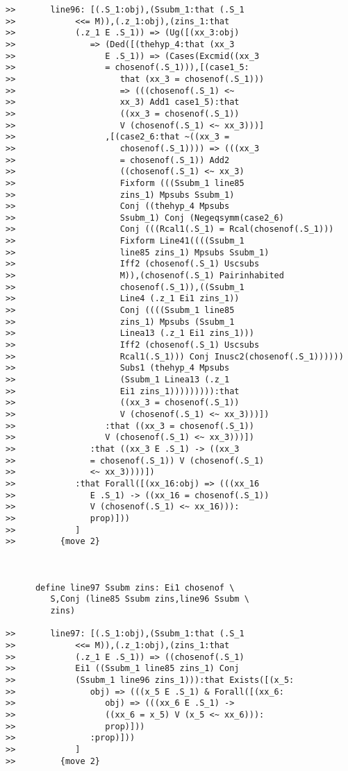 \documentclass[12pt]{article}
\begin{document}
\begin{verbatim}
>>       line96: [(.S_1:obj),(Ssubm_1:that (.S_1
>>            <<= M)),(.z_1:obj),(zins_1:that
>>            (.z_1 E .S_1)) => (Ug([(xx_3:obj)
>>               => (Ded([(thehyp_4:that (xx_3
>>                  E .S_1)) => (Cases(Excmid((xx_3
>>                  = chosenof(.S_1))),[(case1_5:
>>                     that (xx_3 = chosenof(.S_1)))
>>                     => (((chosenof(.S_1) <~
>>                     xx_3) Add1 case1_5):that
>>                     ((xx_3 = chosenof(.S_1))
>>                     V (chosenof(.S_1) <~ xx_3)))]
>>                  ,[(case2_6:that ~((xx_3 =
>>                     chosenof(.S_1)))) => (((xx_3
>>                     = chosenof(.S_1)) Add2
>>                     ((chosenof(.S_1) <~ xx_3)
>>                     Fixform (((Ssubm_1 line85
>>                     zins_1) Mpsubs Ssubm_1)
>>                     Conj ((thehyp_4 Mpsubs
>>                     Ssubm_1) Conj (Negeqsymm(case2_6)
>>                     Conj (((Rcal1(.S_1) = Rcal(chosenof(.S_1)))
>>                     Fixform Line41((((Ssubm_1
>>                     line85 zins_1) Mpsubs Ssubm_1)
>>                     Iff2 (chosenof(.S_1) Uscsubs
>>                     M)),(chosenof(.S_1) Pairinhabited
>>                     chosenof(.S_1)),((Ssubm_1
>>                     Line4 (.z_1 Ei1 zins_1))
>>                     Conj ((((Ssubm_1 line85
>>                     zins_1) Mpsubs (Ssubm_1
>>                     Linea13 (.z_1 Ei1 zins_1)))
>>                     Iff2 (chosenof(.S_1) Uscsubs
>>                     Rcal1(.S_1))) Conj Inusc2(chosenof(.S_1))))))
>>                     Subs1 (thehyp_4 Mpsubs
>>                     (Ssubm_1 Linea13 (.z_1
>>                     Ei1 zins_1))))))))):that
>>                     ((xx_3 = chosenof(.S_1))
>>                     V (chosenof(.S_1) <~ xx_3)))])
>>                  :that ((xx_3 = chosenof(.S_1))
>>                  V (chosenof(.S_1) <~ xx_3)))])
>>               :that ((xx_3 E .S_1) -> ((xx_3
>>               = chosenof(.S_1)) V (chosenof(.S_1)
>>               <~ xx_3))))])
>>            :that Forall([(xx_16:obj) => (((xx_16
>>               E .S_1) -> ((xx_16 = chosenof(.S_1))
>>               V (chosenof(.S_1) <~ xx_16))):
>>               prop)]))
>>            ]
>>         {move 2}



      define line97 Ssubm zins: Ei1 chosenof \
         S,Conj (line85 Ssubm zins,line96 Ssubm \
         zins)

>>       line97: [(.S_1:obj),(Ssubm_1:that (.S_1
>>            <<= M)),(.z_1:obj),(zins_1:that
>>            (.z_1 E .S_1)) => ((chosenof(.S_1)
>>            Ei1 ((Ssubm_1 line85 zins_1) Conj
>>            (Ssubm_1 line96 zins_1))):that Exists([(x_5:
>>               obj) => (((x_5 E .S_1) & Forall([(xx_6:
>>                  obj) => (((xx_6 E .S_1) ->
>>                  ((xx_6 = x_5) V (x_5 <~ xx_6))):
>>                  prop)]))
>>               :prop)]))
>>            ]
>>         {move 2}




\end{verbatim}
\end{document}
